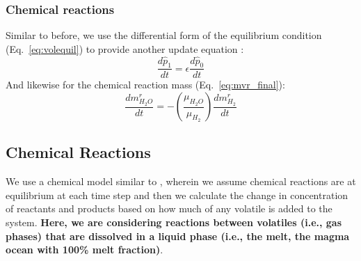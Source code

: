 \subsubsection{Chemical reactions}
Similar to before, we use the differential form of the equilibrium condition (Eq.~\ref{eq:volequil}) to provide another update equation :
\begin{equation}
\frac{d\hat{p}_1}{dt} = \epsilon \frac{d\hat{p}_0}{dt}
\end{equation}
And likewise for the chemical reaction mass (Eq.~\ref{eq:mvr_final}):
\begin{equation}
\frac{dm_{H_2O}^r}{dt} = - \left( \frac{\mu_{H_2O}}{\mu_{H_2}} \right) \frac{dm_{H_2}^r}{dt}
\label{eq:mvr_final}
\end{equation}
\subsection{Chemical Reactions}
We use a chemical model similar to \cite{GS14}, wherein we assume chemical reactions are at equilibrium at each time step and then we calculate the change in concentration of reactants and products based on how much of any volatile is added to the system.  \textbf{Here, we are considering reactions between volatiles (i.e., gas phases) that are dissolved in a liquid phase (i.e., the melt, the magma ocean with 100\% melt fraction)}.
